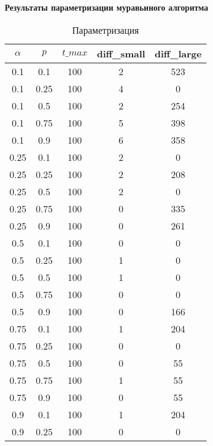 
\begin{center}
\textbf{Результаты параметризации муравьиного алгоритма}
\end{center}

\renewcommand{\thetable}{\textmd{A.1}}

\noindent
\captionsetup{format=hang,justification=raggedright,
              singlelinecheck=off,width=9.2cm}

\begin{longtable}[c]{|c|c|c|c|c|}
    \caption{Параметризация} \label{tbl:param}
\hline
$\alpha$ & $p$ & $t\_max$ & diff\_small & diff\_large
\tabularnewline 
\hline
0.1 & 0.1 & 100 & 2 & 523 \\ 
\hline
0.1 & 0.25 & 100 & 4 & 0 \\ 
\hline
0.1 & 0.5 & 100 & 2 & 254 \\ 
\hline
0.1 & 0.75 & 100 & 5 & 398 \\ 
\hline
0.1 & 0.9 & 100 & 6 & 358 \\ 
\hline
0.25 & 0.1 & 100 & 2 & 0 \\ 
\hline
0.25 & 0.25 & 100 & 2 & 208 \\ 
\hline
0.25 & 0.5 & 100 & 2 & 0 \\ 
\hline
0.25 & 0.75 & 100 & 0 & 335 \\ 
\hline
0.25 & 0.9 & 100 & 0 & 261 \\ 
\hline
0.5 & 0.1 & 100 & 0 & 0 \\ 
\hline
0.5 & 0.25 & 100 & 1 & 0 \\ 
\hline
0.5 & 0.5 & 100 & 1 & 0 \\ 
\hline
0.5 & 0.75 & 100 & 0 & 0 \\ 
\hline
0.5 & 0.9 & 100 & 0 & 166 \\ 
\hline
0.75 & 0.1 & 100 & 1 & 204 \\ 
\hline
0.75 & 0.25 & 100 & 0 & 0 \\ 
\hline
0.75 & 0.5 & 100 & 0 & 55 \\ 
\hline
0.75 & 0.75 & 100 & 1 & 55 \\ 
\hline
0.75 & 0.9 & 100 & 0 & 55 \\ 
\hline
0.9 & 0.1 & 100 & 1 & 204 \\ 
\hline
0.9 & 0.25 & 100 & 0 & 0 \\ 
\hline
\end{longtable}

